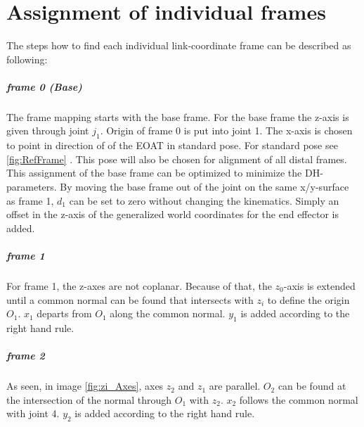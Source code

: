 \chapter{Assignment of individual frames} 
\label{app:IndFrameAss}

The steps how to find each individual link-coordinate frame can be described as following:

\paragraph{frame 0 (Base)}
The frame mapping starts with the base frame. For the base frame the z-axis is given through joint $j_1$. Origin of frame 0 is put into joint 1.
The x-axis is chosen to point in direction of of the \ac{EOAT} in standard pose. For standard pose see 
\ref{fig:RefFrame}
.
This pose will also be chosen for alignment of all distal frames.
\\
This assignment of the base frame can be optimized to minimize the \ac{DH}-parameters. By moving the base frame out of the joint on the same x/y-surface as frame 1, $d_1$ can be set to zero without changing the kinematics. Simply an offset in the z-axis of the generalized world coordinates for the end effector is added.


\paragraph{frame 1}
For frame 1, the z-axes are not coplanar. 
Because of that, the  $z_0$-axis is extended until a common normal can be found that intersects with $z_i$ to define the origin $O_1$.
$x_1$ departs from $O_1$ along the common normal.
$y_1$ is added according to the right hand rule.

\paragraph{frame 2}
As seen, in image \ref{fig:zi_Axes}, axes $z_2$ and $z_1$ are parallel. $O_2$ can be found at the intersection of the normal through $O_1$ with $z_2$. $x_2$ follows the common normal with joint 4.
$y_2$ is added according to the right hand rule.

